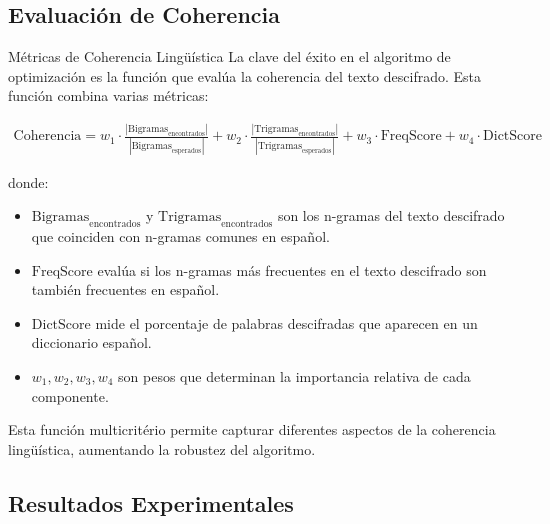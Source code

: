 \subsection{Evaluación de Coherencia}

\begin{cryptoanalysis}{Métricas de Coherencia Lingüística}
La clave del éxito en el algoritmo de optimización es la función que evalúa la coherencia del texto descifrado. Esta función combina varias métricas:

\begin{align}
\text{Coherencia} = w_1 \cdot \frac{|\text{Bigramas}_{\text{encontrados}}|}{|\text{Bigramas}_{\text{esperados}}|} + 
w_2 \cdot \frac{|\text{Trigramas}_{\text{encontrados}}|}{|\text{Trigramas}_{\text{esperados}}|} + 
w_3 \cdot \text{FreqScore} + 
w_4 \cdot \text{DictScore}
\end{align}

donde:
\begin{itemize}
    \item $\text{Bigramas}_{\text{encontrados}}$ y $\text{Trigramas}_{\text{encontrados}}$ son los n-gramas del texto descifrado que coinciden con n-gramas comunes en español.
    \item $\text{FreqScore}$ evalúa si los n-gramas más frecuentes en el texto descifrado son también frecuentes en español.
    \item $\text{DictScore}$ mide el porcentaje de palabras descifradas que aparecen en un diccionario español.
    \item $w_1, w_2, w_3, w_4$ son pesos que determinan la importancia relativa de cada componente.
\end{itemize}

Esta función multicritério permite capturar diferentes aspectos de la coherencia lingüística, aumentando la robustez del algoritmo.
\end{cryptoanalysis}

\subsection{Resultados Experimentales}

